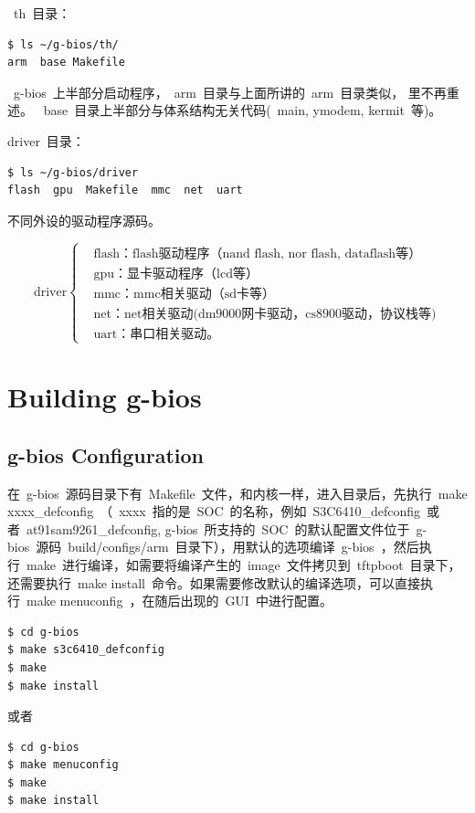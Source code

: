 \documentclass[a4paper,11pt]{book}
\begin{document}
\begin{CJK*}{UTF8}{gbsn}
~th~目录：
\begin{lstlisting}[language={SH}]
$ ls ~/g-bios/th/
arm  base Makefile
\end{lstlisting}
~g-bios~上半部分启动程序，~arm~目录与上面所讲的~arm~目录类似， 里不再重述。
~base~目录上半部分与体系结构无关代码(~main, ymodem, kermit~等)。

driver~目录：
\begin{lstlisting}[language=bash, numbers=none]
$ ls ~/g-bios/driver
flash  gpu  Makefile  mmc  net  uart
\end{lstlisting}
不同外设的驱动程序源码。

\begin{equation*}
\text{driver}
\left\{
	\begin{aligned}
	&\text{flash：flash驱动程序（nand flash, nor flash, dataflash等）}\\
	&\text{gpu：显卡驱动程序（lcd等）}\\
	&\text{mmc：mmc相关驱动（sd卡等）}\\
	&\text{net：net相关驱动(dm9000网卡驱动，cs8900驱动，协议栈等)}\\
	&\text{uart：串口相关驱动。}
	\end{aligned}
\right.
\end{equation*}

\chapter{Building g-bios}
\section{g-bios Configuration}
在~g-bios~源码目录下有~Makefile~文件，和内核一样，进入目录后，先执行~make xxxx\_defconfig~（~xxxx~指的是~SOC~的名称，例如~S3C6410\_defconfig~或者~at91sam9261\_defconfig, g-bios~所支持的~SOC~的默认配置文件位于~g-bios~源码~build/configs/arm~目录下），用默认的选项编译~g-bios~，然后执行~make~进行编译，如需要将编译产生的~image~文件拷贝到~tftpboot~目录下，还需要执行~make install~命令。如果需要修改默认的编译选项，可以直接执行~make menuconfig~，在随后出现的~GUI~中进行配置。
\begin{lstlisting}[language=bash, numbers=none]
$ cd g-bios
$ make s3c6410_defconfig
$ make
$ make install
\end{lstlisting}
或者
\begin{lstlisting}[language=bash, numbers=none]
$ cd g-bios
$ make menuconfig
$ make
$ make install
\end{lstlisting}



\end{CJK*}
\end{document}
